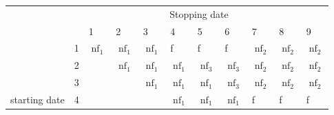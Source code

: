 \documentclass[main.tex]{subfiles}
\begin{document}
\begin{table}[]
\begin{tabular}{lllllllllll}
                                   & \multicolumn{10}{c}{Stopping date}                                                                                                                                                                                                                                                 \\ \cline{2-11} 
\multicolumn{1}{l|}{}              & \multicolumn{1}{l|}{}  & \multicolumn{1}{l|}{1}    & \multicolumn{1}{l|}{2}    & \multicolumn{1}{l|}{3}    & \multicolumn{1}{l|}{4}    & \multicolumn{1}{l|}{5}    & \multicolumn{1}{l|}{6}    & \multicolumn{1}{l|}{7}    & \multicolumn{1}{l|}{8}    & \multicolumn{1}{l|}{9}    \\ \cline{2-11} 
\multicolumn{1}{l|}{}              & \multicolumn{1}{l|}{1} & \multicolumn{1}{l|}{$\operatorname{nf}_1$} & \multicolumn{1}{l|}{$\operatorname{nf}_1$} & \multicolumn{1}{l|}{$\operatorname{nf}_1$} & \multicolumn{1}{l|}{f}   & \multicolumn{1}{l|}{f}   & \multicolumn{1}{l|}{f}   & \multicolumn{1}{l|}{$\operatorname{nf}_2$} & \multicolumn{1}{l|}{$\operatorname{nf}_2$} & \multicolumn{1}{l|}{$\operatorname{nf}_2$} \\ \cline{2-11} 
\multicolumn{1}{l|}{}              & \multicolumn{1}{l|}{2} & \multicolumn{1}{l|}{}     & \multicolumn{1}{l|}{$\operatorname{nf}_1$} & \multicolumn{1}{l|}{$\operatorname{nf}_1$} & \multicolumn{1}{l|}{$\operatorname{nf}_1$} & \multicolumn{1}{l|}{$\operatorname{nf}_3$} & \multicolumn{1}{l|}{$\operatorname{nf}_3$} & \multicolumn{1}{l|}{$\operatorname{nf}_2$} & \multicolumn{1}{l|}{$\operatorname{nf}_2$} & \multicolumn{1}{l|}{$\operatorname{nf}_2$} \\ \cline{2-11} 
\multicolumn{1}{l|}{}              & \multicolumn{1}{l|}{3} & \multicolumn{1}{l|}{}     & \multicolumn{1}{l|}{}     & \multicolumn{1}{l|}{$\operatorname{nf}_1$} & \multicolumn{1}{l|}{$\operatorname{nf}_1$} & \multicolumn{1}{l|}{$\operatorname{nf}_1$} & \multicolumn{1}{l|}{$\operatorname{nf}_3$} & \multicolumn{1}{l|}{$\operatorname{nf}_2$} & \multicolumn{1}{l|}{$\operatorname{nf}_2$} & \multicolumn{1}{l|}{$\operatorname{nf}_2$} \\ \cline{2-11} 
\multicolumn{1}{l|}{starting date} & \multicolumn{1}{l|}{4} & \multicolumn{1}{l|}{}     & \multicolumn{1}{l|}{}     & \multicolumn{1}{l|}{}     & \multicolumn{1}{l|}{$\operatorname{nf}_1$} & \multicolumn{1}{l|}{$\operatorname{nf}_1$} & \multicolumn{1}{l|}{$\operatorname{nf}_1$} & \multicolumn{1}{l|}{f}   & \multicolumn{1}{l|}{f}   & \multicolumn{1}{l|}{f}   \\ \cline{2-11} 

\end{tabular}
\end{table}
\end{document}
